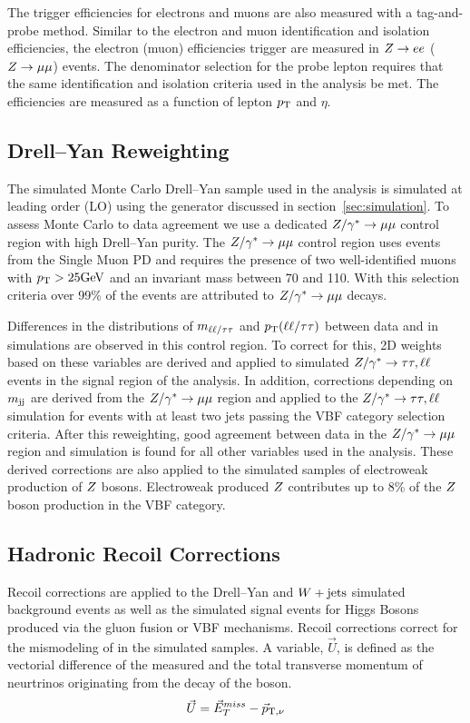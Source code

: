 The trigger efficiencies for electrons and muons are also measured with a tag-and-probe method.
Similar to the electron and muon identification and isolation efficiencies, the 
electron (muon) efficiencies trigger are measured in $Z\to ee$ ($Z\to\mu\mu$) events.
The denominator selection for the probe lepton requires that the same identification and
isolation criteria used in the analysis be met. The efficiencies are measured as a function of
lepton $p_\mathrm{T}$ and $\eta$.



\subsection{Drell--Yan Reweighting}

The simulated Monte Carlo Drell--Yan sample used in the analysis is simulated at leading order (LO)
using the \aMCATNLO generator discussed in section~\ref{sec:simulation}. To assess Monte Carlo to
data agreement we use a dedicated $Z/\gamma^*\to\mu\mu$ control region with high Drell--Yan purity.
The $Z/\gamma^*\to\mu\mu$ control region uses events from the Single Muon PD and requires the 
presence of two well-identified muons with $p_\mathrm{T} > 25 \mathrm{GeV}$ and an invariant mass between 70 and 110\GeV.
With this selection criteria over 99\% of the events are attributed to $Z/\gamma^*\to\mu\mu$ decays.

Differences in the distributions of $m_{\ell\ell/\tau\tau}$ and $p_\mathrm{T}(\ell\ell/\tau\tau)$ between data and 
in simulations are observed in this control region. To correct for this, 2D weights based on these variables 
are derived and applied to simulated $Z/\gamma^*\to\tau\tau, \ell\ell$ events in the signal region of the analysis. 
In addition, corrections depending on $m_\mathrm{jj}$ are derived from the $Z/\gamma^*\to\mu\mu$ region and 
applied to the $Z/\gamma^*\to\tau\tau, \ell\ell$ simulation for events with at least two jets passing the 
VBF category selection criteria. After this reweighting, good agreement between data in the 
$Z/\gamma^*\to\mu\mu$ region and simulation is found for all other variables used in the analysis.
These derived corrections are also applied to the simulated samples of electroweak production of $Z$ 
bosons. Electroweak produced $Z$ contributes up to 8\% of the $Z$ boson production in the VBF category.



\subsection{Hadronic Recoil Corrections}
Recoil corrections are applied to the Drell--Yan and $W+\text{jets}$ simulated background events 
as well as the simulated signal events for 
Higgs Bosons produced via the gluon fusion or VBF mechanisms. Recoil corrections correct for the
mismodeling of \etvecmiss in the simulated samples. A variable, $\vec{U}$, is defined as the 
vectorial difference of the measured \etvecmiss and the total transverse momentum of neurtrinos
originating from the decay of the boson.
\begin{equation}
\vec{U} = \vec{E}^{miss}_T - \vec{p}_{\text{T},\nu}
\end{equation}

